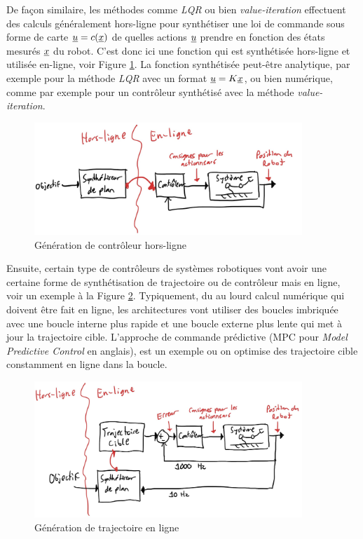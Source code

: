 De façon similaire, les méthodes comme \textit{LQR} ou bien \textit{value-iteration} effectuent des calculs généralement hors-ligne pour synthétiser une loi de commande sous forme de carte $\underline{u} = c(\underline{x})$ de quelles actions $\underline{u}$ prendre en fonction des états mesurés $\underline{x}$ du robot. C'est donc ici une fonction qui est synthétisée hors-ligne et utilisée en-ligne, voir Figure \ref{fig:offlinecontrollergeneration}. La fonction synthétisée peut-être analytique, par exemple pour la méthode \textit{LQR} avec un format $\underline{u} = K \underline{x}$, ou bien numérique, comme par exemple pour un contrôleur synthétisé avec la méthode \textit{value-iteration}. 
\begin{figure}[htbp]
	\centering
		\includegraphics[width=0.9\textwidth]{fig/offlinecontrollergeneration.jpg}
	\caption{Génération de contrôleur hors-ligne}
	\label{fig:offlinecontrollergeneration}
\end{figure}

Ensuite, certain type de contrôleurs de systèmes robotiques vont avoir une certaine forme de synthétisation de trajectoire ou de contrôleur mais en ligne, voir un exemple à la Figure \ref{fig:onlinetrajectorygeneration}. Typiquement, du au lourd calcul numérique qui doivent être fait en ligne, les architectures vont utiliser des boucles imbriquée avec une boucle interne plus rapide et une boucle externe plus lente qui met à jour la trajectoire cible. L'approche de commande prédictive (MPC pour \textit{Model Predictive Control} en anglais), est un exemple ou on optimise des trajectoire cible constamment en ligne dans la boucle. 
\begin{figure}[htbp]
	\centering
		\includegraphics[width=0.9\textwidth]{fig/onlinetrajectorygeneration.jpg}
	\caption{Génération de trajectoire en ligne}
	\label{fig:onlinetrajectorygeneration}
\end{figure}




